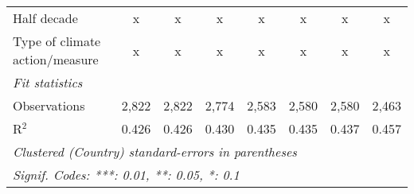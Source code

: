 \begin{tabular}{lccccccc}
   Half decade                                                                          & x             & x             & x             & x             & x             & x             & x\\  
   Type of climate action/measure                                                       & x             & x             & x             & x             & x             & x             & x\\  
   \midrule \emph{Fit statistics}\\
   Observations                                                                         & 2,822         & 2,822         & 2,774         & 2,583         & 2,580         & 2,580         & 2,463\\  
   R$^2$                                                                                & 0.426         & 0.426         & 0.430         & 0.435         & 0.435         & 0.437         & 0.457\\  
   \midrule
   \multicolumn{8}{l}{\emph{Clustered (Country) standard-errors in parentheses}}\\
   \multicolumn{8}{l}{\emph{Signif. Codes: ***: 0.01, **: 0.05, *: 0.1}}\\
\end{tabular}
\par\endgroup


